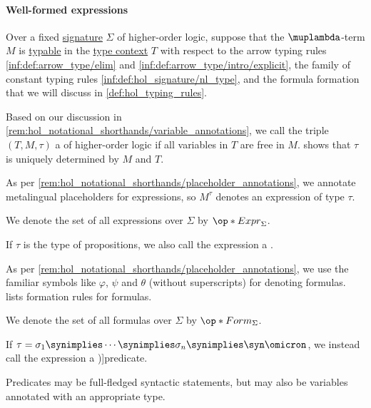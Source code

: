 \paragraph{Well-formed expressions}

\begin{definition}\label{def:hol_expression}\mimprovised
  Over a fixed \hyperref[def:hol_signature]{signature} \( \Sigma \) of higher-order logic, suppose that the \( \muplambda \)-term \( M \) is \hyperref[def:typability]{typable} in the \hyperref[def:type_context]{type context} \( T \) with respect to the arrow typing rules \ref{inf:def:arrow_type/elim} and \ref{inf:def:arrow_type/intro/explicit}, the family of constant typing rules \ref{inf:def:hol_signature/nl_type}, and the formula formation that we will discuss in \cref{def:hol_typing_rules}.

  Based on our discussion in \cref{rem:hol_notational_shorthands/variable_annotations}, we call the triple \( (T, M, \tau) \) a  of higher-order logic if all variables in \( T \) are free in \( M \).  shows that \( \tau \) is uniquely determined by \( M \) and \( T \).

  As per \cref{rem:hol_notational_shorthands/placeholder_annotations}, we annotate metalingual placeholders for expressions, so \( M^\tau \) denotes an expression of type \( \tau \).

  We denote the set of all expressions over \( \Sigma \) by \( \op*{Expr}_\Sigma \).

  \begin{thmenum}[resume=def:hol_expression]
     If \( \tau \) is the type of propositions, we also call the expression a .

    As per \cref{rem:hol_notational_shorthands/placeholder_annotations}, we use the familiar symbols like \( \varphi \), \( \psi \) and \( \theta \) (without superscripts) for denoting formulas.  lists formation rules for formulas.

    We denote the set of all formulas over \( \Sigma \) by \( \op*{Form}_\Sigma \).

     If \( \tau = \sigma_1 \synimplies \cdots \synimplies \sigma_n \synimplies \syn\omicron \), we instead call the expression a \term[en=predicate (\cite[270]{Farmer2008STTVirtues})]{predicate}.

    Predicates may be full-fledged syntactic statements, but may also be variables annotated with an appropriate type.
  \end{thmenum}
\end{definition}
